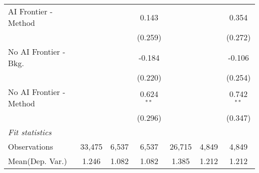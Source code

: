 \begin{tabular}{lcccccc}
   AI Frontier - Method    &              &             & 0.143        &             &              & 0.354\\   
                           &              &             & (0.259)      &             &              & (0.272)\\   
   No AI Frontier - Bkg.   &              &             & -0.184       &             &              & -0.106\\   
                           &              &             & (0.220)      &             &              & (0.254)\\   
   No AI Frontier - Method &              &             & 0.624$^{**}$ &             &              & 0.742$^{**}$\\   
                           &              &             & (0.296)      &             &              & (0.347)\\   
   \midrule
   \emph{Fit statistics}\\
   Observations            & 33,475       & 6,537       & 6,537        & 26,715      & 4,849        & 4,849\\  
Mean(Dep. Var.) & 1.246 & 1.082 & 1.082 & 1.385 & 1.212 & 1.212 \\
   

\end{tabular}
